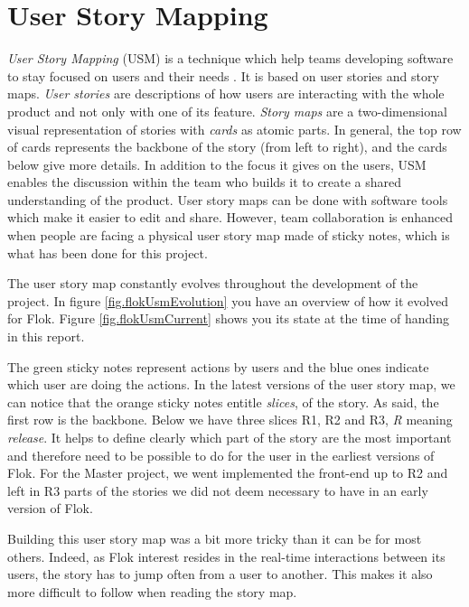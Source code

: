 \documentclass[a4paper,12pt, oneside]{article}
\begin{document}
\section{User Story Mapping}
\emph{User Story Mapping} (USM) is a technique which help teams developing software to stay focused on users and their needs \cite{patton2014user}.
It is based on user stories and story maps. \emph{User stories} are descriptions of how users are interacting with the whole product and not only with one of its feature. \emph{Story maps} are a two-dimensional visual representation of stories with \emph{cards} as atomic parts.
In general, the top row of cards represents the backbone of the story (from left to right), and the cards below give more details.
In addition to the focus it gives on the users, USM enables the discussion within the team who builds it to create a shared understanding of the product.
User story maps can be done with software tools which make it easier to edit and share. However, team collaboration is enhanced when people are facing a physical user story map made of sticky notes, which is what has been done for this project.

The user story map constantly evolves throughout the development of the project.
In figure \ref{fig.flokUsmEvolution} you have an overview of how it evolved for Flok.
Figure \ref{fig.flokUsmCurrent} shows you its state at the time of handing in this report.

The green sticky notes represent actions by users and the blue ones indicate which user are doing the actions.
In the latest versions of the user story map, we can notice that the orange sticky notes entitle \emph{slices}, of the story.
As said, the first row is the backbone.
Below we have three slices R1, R2 and R3, \emph{R} meaning \emph{release}.
It helps to define clearly which part of the story are the most important and therefore need to be possible to do for the user in the earliest versions of Flok. For the Master project, we went implemented the front-end up to R2 and left in R3 parts of the stories we did not deem necessary to have in an early version of Flok.

Building this user story map was a bit more tricky than it can be for most others.
Indeed, as Flok interest resides in the real-time interactions between its users, the story has to jump often from a user to another.
This makes it also more difficult to follow when reading the story map.
\end{document}
